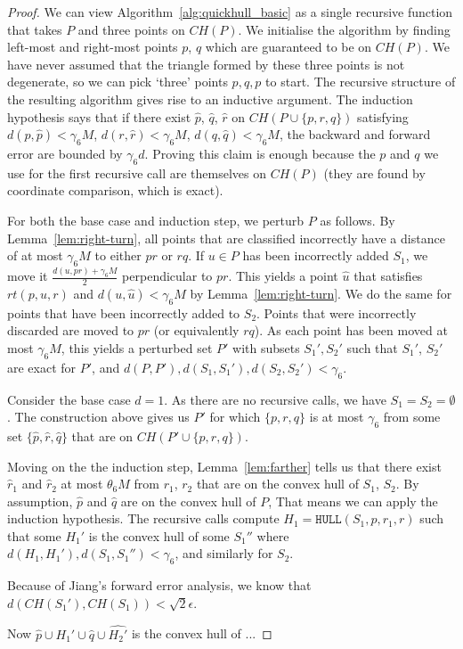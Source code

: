 \begin{proof}
    We can view Algorithm~\ref{alg:quickhull_basic} as a single recursive 
    function that takes $P$ and three points on $CH(P)$. We initialise the
    algorithm by finding left-most and right-most points $p$, $q$ which
    are guaranteed to be on $CH(P)$. We have never assumed that the triangle
    formed by these three points is not degenerate, so we can pick `three'
    points $p, q, p$ to start. The recursive structure of the resulting 
    algorithm gives rise to an inductive argument. The induction hypothesis
    says that if there exist $\hat{p}$, $\hat{q}$, $\hat{r}$ on
    $CH(P \cup \{p, r, q\})$ satisfying $d(p, \hat{p}) < \gamma_6 M$, 
    $d(r, \hat{r}) < \gamma_6 M$, $d(q, \hat{q}) < \gamma_6 M$, the backward
    and forward error are bounded by $\gamma_6 d$. Proving this claim is enough
    because the $p$ and $q$ we use for the first recursive call are themselves
    on $CH(P)$ (they are found by coordinate comparison, which is exact).

    For both the base case and induction step, we perturb $P$ as follows.
    By Lemma~\ref{lem:right-turn}, all points that are classified incorrectly 
    have a distance of at most $\gamma_6 M$ to either $pr$ or $rq$. If 
    $u \in P$ has been incorrectly added $S_1$, we move it 
    $\frac{d(u, pr) + \gamma_6 M}{2}$ perpendicular to $pr$. This yields a 
    point $\hat{u}$ that satisfies $rt(p, u, r)$ and 
    $d(u, \hat{u}) < \gamma_6 M$ by Lemma~\ref{lem:right-turn}. We do the same 
    for points that have been incorrectly added to $S_2$. Points that were 
    incorrectly discarded are moved to $pr$ (or equivalently $rq$). As each 
    point has been moved at most $\gamma_6 M$, this yields a perturbed set 
    $P'$ with subsets $S_1', S_2'$ such that $S_1'$, $S_2'$ are exact for $P'$, 
    and $d(P, P'), d(S_1, S_1'), d(S_2, S_2') < \gamma_6$.

    Consider the base case $d = 1$. As there are no recursive calls, we have 
    $S_1 = S_2 = \emptyset$. The construction above gives us $P'$ for which
    $\{p, r, q\}$ is at most $\gamma_6$ from some set 
    $\{\hat{p}, \hat{r}, \hat{q}\}$ that are on $CH(P' \cup \{p, r, q\})$.

    Moving on the the induction step, Lemma~\ref{lem:farther} tells us
    that there exist $\hat{r}_1$ and $\hat{r}_2$ at most $\theta_6 M$ from
    $r_1$, $r_2$ that are on the convex hull of $S_1$, $S_2$. By assumption,
    $\hat{p}$ and $\hat{q}$ are on the convex hull of $P$, That means we
    can apply the induction hypothesis. The recursive calls compute
    $H_1 = \texttt{HULL}(S_1, p, r_1, r)$ such that some $H_1'$ is
    the convex hull of some $S_1''$ where 
    $d(H_1, H_1'), d(S_1, S_1'') < \gamma_6$, and similarly for $S_2$. 

    Because of Jiang's forward error analysis, we know that 
    $d(CH(S_1'), CH(S_1)) < \sqrt{2} \epsilon$.

    Now $\hat{p} \cup H_1' \cup \hat{q} \cup \hat{H_2'}$ is the convex hull
    of ...
\end{proof}
